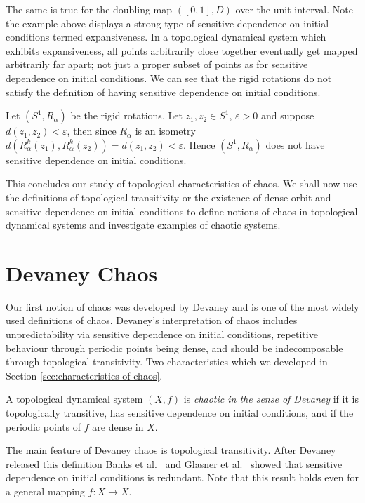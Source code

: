 The same is true for the doubling map $([0, 1], D)$ over the unit interval. Note the example above displays a strong type of sensitive dependence on initial conditions termed expansiveness. In a topological dynamical system which exhibits expansiveness, all points arbitrarily close together eventually get mapped arbitrarily far apart; not just a proper subset of points as for sensitive dependence on initial conditions. We can see that the rigid rotations do not satisfy the definition of having sensitive dependence on initial conditions.

\begin{exmp} \label{exmp:rigid-rotations-not-sensitive}
    Let $(S^1, R_\alpha)$ be the rigid rotations. Let $z_1,z_2 \in S^1$, $\varepsilon > 0$ and suppose $d(z_1, z_2) < \varepsilon$, then since $R_\alpha$ is an isometry $d(R_\alpha^k(z_1), R_\alpha^k(z_2)) = d(z_1, z_2) < \varepsilon$. Hence $(S^1, R_\alpha)$ does not have sensitive dependence on initial conditions.
\end{exmp}

This concludes our study of topological characteristics of chaos. We shall now use the definitions of topological transitivity or the existence of dense orbit and sensitive dependence on initial conditions to define notions of chaos in topological dynamical systems and investigate examples of chaotic systems.

\section{Devaney Chaos} \label{sec:devaney-chaos}

Our first notion of chaos was developed by Devaney \cite{devaney} and is one of the most widely used definitions of chaos. Devaney's interpretation of chaos includes unpredictability via sensitive dependence on initial conditions, repetitive behaviour through periodic points being dense, and should be indecomposable through topological transitivity. Two characteristics which we developed in Section \ref{sec:characteristics-of-chaos}.

\begin{defn}  \label{defn:devaney-chaos}
    A topological dynamical system $(X, f)$ is \emph{chaotic in the sense of Devaney} if it is topologically transitive, has sensitive dependence on initial conditions, and if the periodic points of $f$ are dense in $X$.
\end{defn}

The main feature of Devaney chaos is topological transitivity. After Devaney released this definition Banks et al.\ \cite{bbcds} and Glasner et al.\ \cite{glasner-weiss} showed that sensitive dependence on initial conditions is redundant. Note that this result holds even for a general mapping $f: X \to X$.

